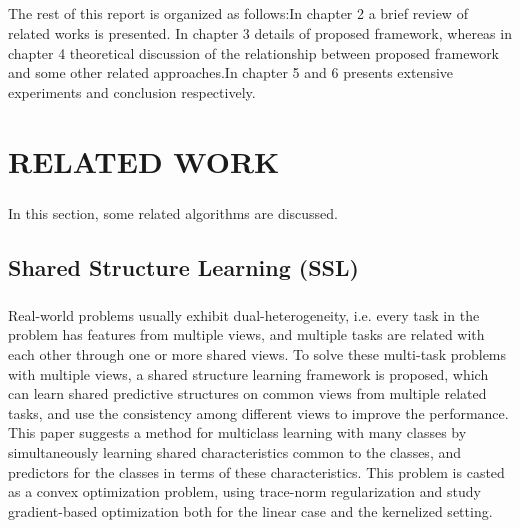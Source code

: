 \documentclass[a4paper,11pt]{report}
\begin{document}
\paragraph{}The rest of this report is organized
as follows:In chapter 2 a brief review of related works is presented. In chapter 3 details of proposed framework, whereas in chapter
4 theoretical discussion of the relationship
between proposed framework and some other related approaches.In chapter 5 and 6 presents
 extensive experiments and  conclusion respectively.

\chapter{RELATED WORK}

\paragraph{}In this section, some related algorithms are discussed. 
\paragraph{}

\section{Shared Structure
Learning (SSL)}
\paragraph{}
Real-world problems usually exhibit dual-heterogeneity, i.e. every task in the problem has features from multiple views, and multiple tasks are related with each other through one or more shared views. To solve these multi-task problems with multiple views, a shared structure learning framework is proposed, which can learn shared predictive structures on common views from multiple related tasks, and use the consistency among different views to improve the performance. This paper suggests a method for multiclass learning with many classes by simultaneously learning shared characteristics common to the classes, and predictors for the classes in terms of these characteristics. This problem is casted  as a convex optimization problem, using trace-norm regularization and study gradient-based optimization both for the linear case and the kernelized setting. 
\end{document}
